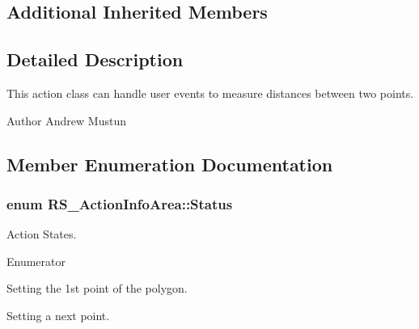 \subsection*{Additional Inherited Members}


\subsection{Detailed Description}
This action class can handle user events to measure distances between two points.

\begin{DoxyAuthor}{Author}
Andrew Mustun 
\end{DoxyAuthor}


\subsection{Member Enumeration Documentation}
\hypertarget{classRS__ActionInfoArea_a453c212e4ec9f4e54589b4de4fe341a2}{
\subsubsection[{Status}]{\setlength{\rightskip}{0pt plus 5cm}enum {\bf R\-S\-\_\-\-Action\-Info\-Area\-::\-Status}}}\label{classRS__ActionInfoArea_a453c212e4ec9f4e54589b4de4fe341a2}
Action States. \begin{Desc}
\item[Enumerator]\par
\begin{description}
\item[{\em 
\hypertarget{classRS__ActionInfoArea_a453c212e4ec9f4e54589b4de4fe341a2a6836447f213e6b302408432a9d6512b7}{Set\-First\-Point}\label{classRS__ActionInfoArea_a453c212e4ec9f4e54589b4de4fe341a2a6836447f213e6b302408432a9d6512b7}
}]Setting the 1st point of the polygon. \item[{\em 
\hypertarget{classRS__ActionInfoArea_a453c212e4ec9f4e54589b4de4fe341a2ac94f2bf4fbe7a9c88db98264233062a0}{Set\-Next\-Point}\label{classRS__ActionInfoArea_a453c212e4ec9f4e54589b4de4fe341a2ac94f2bf4fbe7a9c88db98264233062a0}
}]Setting a next point. \end{description}
\end{Desc}


